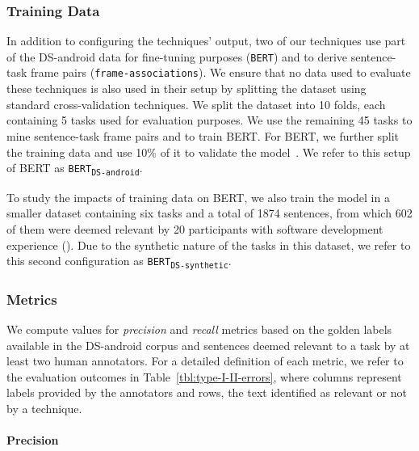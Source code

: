 \subsubsection{Training Data}


In addition to configuring the techniques' output, two of our techniques use part of the  \acs{DS-android} data for fine-tuning purposes (\texttt{BERT}) and to derive sentence-task frame pairs (\texttt{frame-associations}).
We ensure that no data used to evaluate these techniques is also used in their setup by 
splitting the dataset using standard cross-validation techniques.
We split the dataset into 10 folds, each containing 5 tasks used for evaluation purposes. 
We use the remaining 45 tasks to mine sentence-task frame pairs and to train BERT. 
For BERT, we further split the training data and use 10\% of it to validate the model~\cite{Chaparro2017, fucci2019, Petrosyan2015}.
We refer to this setup of BERT as \texttt{BERT\textsubscript{DS-android}}.


To study the impacts of training data on BERT, we also train the model in a smaller dataset containing six tasks and a total of 1874 sentences, from which 602 of them were deemed relevant by 20 participants with software development experience (). Due to the synthetic nature of the tasks in this dataset, we refer to this 
second configuration as \texttt{BERT\textsubscript{DS-synthetic}}.




\subsubsection{Metrics}


We compute values for \textit{precision} and \textit{recall} metrics based on the golden labels available in the \acs{DS-android} corpus and sentences deemed relevant to a task by at least two human annotators.
For a detailed definition of each metric, we refer to the evaluation outcomes in Table~\ref{tbl:type-I-II-errors}, where  columns represent  labels provided by the annotators and rows,
the text identified as relevant or not by a technique.

% 

\medskip




\paragraph{\textbf{Precision}}

